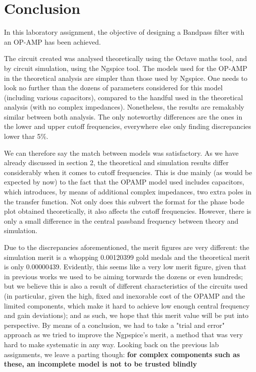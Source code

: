 \section{Conclusion}
\label{sec:conclusion}

In this laboratory assignment, the objective of designing a Bandpass filter with an OP-AMP has been achieved.\par
The circuit created was analysed theoretically using the Octave maths tool, and by circuit simulation, using the
Ngspice tool. The models used for the OP-AMP in the theoretical analysis are simpler than those used by Ngspice. One needs to look no further than the dozens of parameters considered for this model (including various capacitors), compared to the handful used in the theoretical analysis (with no complex impedances). Nonetheless, the results are remakably similar between both analysis. The only noteworthy differences are the ones in the lower and upper cutoff frequencies, everywhere else only finding discrepancies lower thar 5\%.

We can therefore say the match between models was satisfactory. As we have already discussed in section 2, the theoretical and simulation results differ considerably when it comes to cutoff frequencies. This is due mainly (as would be expected by now) to the fact that the OPAMP model used includes capacitors, which introduces, by means of additional complex impedances, two extra poles in the transfer function. Not only does this subvert the format for the phase bode plot obtained theoretically, it also affects the cutoff frequencies. However, there is only a small difference in the central passband frequency between theory and simulation.

Due to the discrepancies aforementioned, the merit figures are very different: the simulation merit is a whopping 0.00120399 gold medals and the theoretical merit is only 0.00000439. Evidently, this seems like a very low merit figure, given that in previous works we used to be aiming torwards the dozens or even hundreds; but we believe this is also a result of different characteristics of the circuits used (in particular, given the high, fixed and inexorable cost of the OPAMP and the limited components, which make it hard to achieve low enough central frequency and gain deviations); and as such, we hope that this merit value will be put into perspective. 
By means of a conclusion, we had to take a "trial and error" approach as we tried to improve the Ngpspice's merit, a method that was very hard to make systematic in any way. Looking back on the previous lab assignments, we leave a parting though: \textbf{for complex components such as these, an incomplete model is not to be trusted blindly}\par


